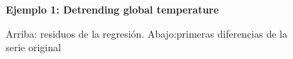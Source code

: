 \begin{figure}[H]
	\centering
	\textbf{Ejemplo 1: Detrending global temperature}\par\medskip
	\caption{Arriba: residuos de la regresión. Abajo:primeras diferencias de la serie original}\label{fig3}
\end{figure}




